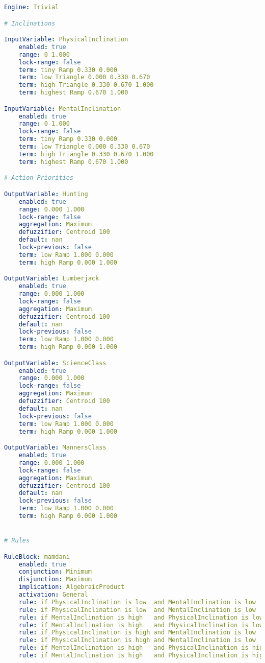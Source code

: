 \documentclass[12pt, a4paper]{article}
\begin{document}
	\begin{lstlisting}[language=yaml]
Engine: Trivial

# Inclinations

InputVariable: PhysicalInclination
	enabled: true
	range: 0 1.000
	lock-range: false
	term: tiny Ramp 0.330 0.000 
	term: low Triangle 0.000 0.330 0.670
	term: high Triangle 0.330 0.670 1.000
	term: highest Ramp 0.670 1.000

InputVariable: MentalInclination
	enabled: true
	range: 0 1.000
	lock-range: false
	term: tiny Ramp 0.330 0.000 
	term: low Triangle 0.000 0.330 0.670
	term: high Triangle 0.330 0.670 1.000
	term: highest Ramp 0.670 1.000

# Action Priorities

OutputVariable: Hunting
	enabled: true
	range: 0.000 1.000
	lock-range: false
	aggregation: Maximum
	defuzzifier: Centroid 100
	default: nan
	lock-previous: false
	term: low Ramp 1.000 0.000
	term: high Ramp 0.000 1.000

OutputVariable: Lumberjack
	enabled: true
	range: 0.000 1.000
	lock-range: false
	aggregation: Maximum
	defuzzifier: Centroid 100
	default: nan
	lock-previous: false
	term: low Ramp 1.000 0.000
	term: high Ramp 0.000 1.000

OutputVariable: ScienceClass
	enabled: true
	range: 0.000 1.000
	lock-range: false
	aggregation: Maximum
	defuzzifier: Centroid 100
	default: nan
	lock-previous: false
	term: low Ramp 1.000 0.000
	term: high Ramp 0.000 1.000

OutputVariable: MannersClass
	enabled: true
	range: 0.000 1.000
	lock-range: false
	aggregation: Maximum
	defuzzifier: Centroid 100
	default: nan
	lock-previous: false
	term: low Ramp 1.000 0.000
	term: high Ramp 0.000 1.000


# Rules

RuleBlock: mamdani
	enabled: true
	conjunction: Minimum
	disjunction: Maximum
	implication: AlgebraicProduct
	activation: General
	rule: if PhysicalInclination is low  and MentalInclination is low    then MannersClass is high
	rule: if PhysicalInclination is low  and MentalInclination is low    then Hunting is low
	rule: if MentalInclination is high   and PhysicalInclination is low  then ScienceClass is high
	rule: if MentalInclination is high   and PhysicalInclination is low  then Lumberjack is low
	rule: if PhysicalInclination is high and MentalInclination is low    then Lumberjack is high
	rule: if PhysicalInclination is high and MentalInclination is low    then ScienceClass is low
	rule: if MentalInclination is high   and PhysicalInclination is high then Hunting is high
	rule: if MentalInclination is high   and PhysicalInclination is high then MannersClass is low
	\end{lstlisting}
	
\end{document}
